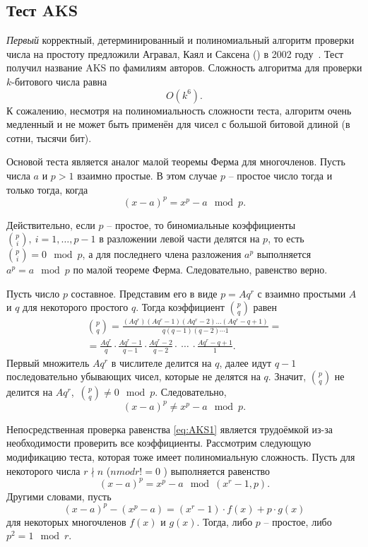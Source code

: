 \subsection{Тест AKS}\label{section-prime-check-aks}

\emph{Первый} корректный, детерминированный и полиномиальный алгоритм проверки числа на простоту предложили Агравал, Каял и Саксена () в 2002 году~\cite{aks:2002}. Тест получил название AKS по фамилиям авторов. Сложность алгоритма для проверки $k$-битового числа равна
    \[ O(k^{6}). \]
К сожалению, несмотря на полиномиальность сложности теста, алгоритм очень медленный и не может быть применён для чисел с большой битовой длиной (в сотни, тысячи бит).

Основой теста является аналог малой теоремы Ферма для многочленов. Пусть числа $a$ и $p>1$ взаимно простые. В этом случае $p$ -- простое число тогда и только тогда, когда
\begin{equation}
    \label{eq:AKS1}
    (x - a)^p = x^p - a \mod p.
\end{equation}

Действительно, если $p$ -- простое, то биномиальные коэффициенты $\binom{p}{i},\ i = 1, \dots, p-1$ в разложении левой части делятся на $p$, то есть~$\binom{p}{i} = 0 \mod p$, а для последнего члена разложения $a^p$ выполняется $a^p = a \mod p$ по малой теореме Ферма. Следовательно, равенство верно.

Пусть число $p$ составное. Представим его в виде $p = A q^r$ с взаимно простыми $A$ и $q$ для некоторого простого $q$. Тогда коэффициент $\binom{p}{q}$ равен
\begin{multline*} 
\binom{p}{q}  = \frac{(A q^r) (A q^r - 1)(A q^r - 2) \dots (A q^r - q + 1)}{q (q-1)(q-2) \cdots 1} = \\ 
= \frac{A q^r}{q} \cdot \frac{A q^r - 1}{q-1} \cdot \frac{A q^r - 2}{q-2} \cdot ~\cdots~ \cdot \frac{A q^r - q + 1}{1}. 
\end{multline*}
Первый множитель $A q^r$ в числителе делится на $q$, далее идут \mbox{$q-1$} последовательно убывающих чисел, которые не делятся на $q$. Значит, $\binom{p}{q}$ не делится на $A q^r$,~$\binom{p}{q} \neq 0 \mod p$. Следовательно,
\[
(x - a)^p \neq x^p - a \mod p.
\]

Непосредственная проверка равенства \eqref{eq:AKS1} является трудоёмкой из-за необходимости проверить все коэффициенты. Рассмотрим следующую модификацию теста, которая тоже имеет полиномиальную сложность. Пусть для некоторого числа $r \nmid n$ ($n mod r != 0$ ) выполняется равенство
\begin{equation}
    \label{eq:AKS2}
    (x - a)^p = x^p - a \mod (x^r-1, p).
\end{equation}
Другими словами, пусть
    \[ (x - a)^p - (x^p - a) = (x^r-1) \cdot f(x) + p \cdot g(x) \]
для некоторых многочленов $f(x)$ и $g(x)$. Тогда, либо $p$ -- простое, либо $p^2 = 1 \mod r$.

